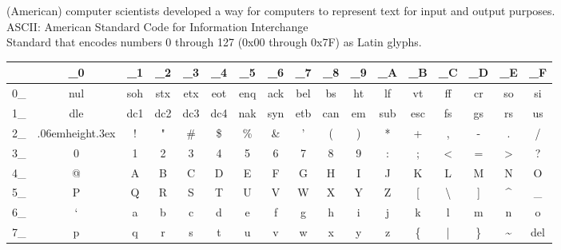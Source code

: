 \documentclass[smaller,xcolor=table,aspectratio=169]{beamer}
\newcommand\Vtextvisiblespace[1][.3em]{%
  \mbox{\kern.06em\vrule height.3ex}%
  \vbox{\hrule width#1}%
  \hbox{\vrule height.3ex}}
\begin{document}
\newcommand{\CNT}{\cellcolor{mathematica green!25}}
\newcommand{\ALP}{\cellcolor{mathematica orange!25}}
\newcommand{\PUN}{\cellcolor{mathematica purple!25}}
\begin{frame}[plain]
  (American) computer scientists developed a way for computers to represent text for input and output purposes.\\
  ASCII: American Standard Code for Information Interchange\\
  Standard that encodes numbers 0 through 127 (0x00 through 0x7F) as Latin glyphs.\\
  \begin{table}
    \tiny\ttfamily
    \begin{tabular}{r|c|c|c|c|c|c|c|c|c|c|c|c|c|c|c|c}
      & \_0 & \_1 & \_2 & \_3 & \_4 & \_5 & \_6 & \_7 & \_8 & \_9 & \_A & \_B & \_C & \_D & \_E & \_F \\ \hline
      0\_ & \CNT nul & \CNT soh & \CNT stx & \CNT etx & \CNT eot & \CNT enq & \CNT ack & \CNT bel & \CNT bs & \CNT ht & \CNT lf & \CNT vt & \CNT ff & \CNT cr & \CNT so & \CNT si \\
      1\_ & \CNT dle & \CNT dc1 & \CNT dc2 & \CNT dc3 & \CNT dc4 & \CNT nak & \CNT syn & \CNT etb & \CNT can & \CNT em & \CNT sub & \CNT esc & \CNT fs & \CNT gs & \CNT rs & \CNT us \\
      2\_ & \PUN \Vtextvisiblespace & \PUN ! & \PUN " & \PUN \# & \PUN \$ & \PUN \% & \PUN \& & \PUN ' & \PUN ( & \PUN ) & \PUN * & \PUN + & \PUN , & \PUN - & \PUN . & \PUN / \\
      3\_ & \ALP 0 & \ALP 1 & \ALP 2 & \ALP 3 & \ALP 4 & \ALP 5 & \ALP 6 & \ALP 7 & \ALP 8 & \ALP 9 & \PUN : & \PUN ; & \PUN < & \PUN = & \PUN > & \PUN ? \\
      4\_ & \PUN @ & \ALP A & \ALP B & \ALP C & \ALP D & \ALP E & \ALP F & \ALP G & \ALP H & \ALP I & \ALP J & \ALP K & \ALP L & \ALP M & \ALP N & \ALP O \\
      5\_ & \ALP P & \ALP Q & \ALP R & \ALP S & \ALP T & \ALP U & \ALP V & \ALP W & \ALP X & \ALP Y & \ALP Z & \PUN [ & \PUN \textbackslash & \PUN ] & \PUN \textasciicircum & \PUN \_ \\
      6\_ & \PUN ` & \ALP a & \ALP b & \ALP c & \ALP d & \ALP e & \ALP f & \ALP g & \ALP h & \ALP i & \ALP j & \ALP k & \ALP l & \ALP m & \ALP n & \ALP o \\
      7\_ & \ALP p & \ALP q & \ALP r & \ALP s & \ALP t & \ALP u & \ALP v & \ALP w & \ALP x & \ALP y & \ALP z & \PUN \{ & \PUN | & \PUN \} & \PUN \textasciitilde & \CNT del \\
    \end{tabular}
  \end{table}
\end{frame}
\end{document}
